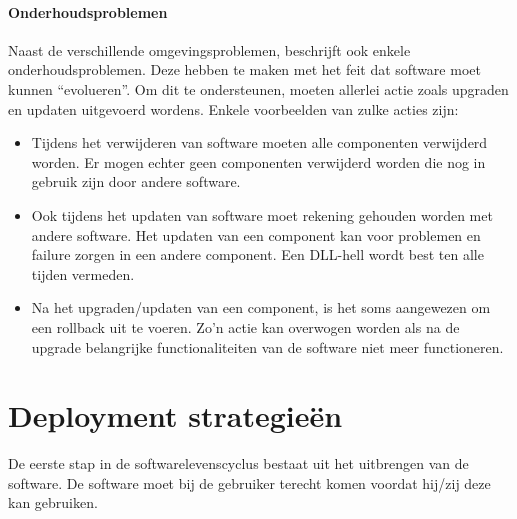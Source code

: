 \paragraph{Onderhoudsproblemen}
Naast de verschillende omgevingsproblemen, beschrijft \citet{dolstra2006purely} ook enkele onderhoudsproblemen.
Deze hebben te maken met het feit dat software moet kunnen ``evolueren''.
Om dit te ondersteunen, moeten allerlei actie zoals upgraden en updaten uitgevoerd wordens.
Enkele voorbeelden van zulke acties zijn:
\begin{itemize}
\item Tijdens het verwijderen van software moeten alle componenten verwijderd worden.
Er mogen echter geen componenten verwijderd worden die nog in gebruik zijn door andere software.
\item Ook tijdens het updaten van software moet rekening gehouden worden met andere software.
Het updaten van een component kan voor problemen en failure zorgen in een andere component.
Een DLL-hell wordt best ten alle tijden vermeden.
\item Na het upgraden/updaten van een component, is het soms aangewezen om een rollback uit te voeren.
Zo'n actie kan overwogen worden als na de upgrade belangrijke functionaliteiten van de software niet meer functioneren.
\end{itemize}

\section{Deployment strategieën}\label{sec:deployment}
De eerste stap in de softwarelevenscyclus bestaat uit het uitbrengen van de software.
De software moet bij de gebruiker terecht komen voordat hij/zij deze kan gebruiken.

